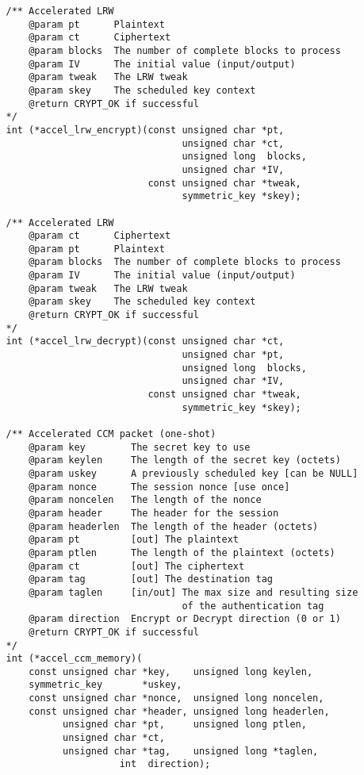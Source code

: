 \documentclass[synpaper]{book}
\begin{document}
\begin{small}
\begin{verbatim}
   /** Accelerated LRW
       @param pt      Plaintext
       @param ct      Ciphertext
       @param blocks  The number of complete blocks to process
       @param IV      The initial value (input/output)
       @param tweak   The LRW tweak
       @param skey    The scheduled key context
       @return CRYPT_OK if successful
   */
   int (*accel_lrw_encrypt)(const unsigned char *pt,
                                  unsigned char *ct,
                                  unsigned long  blocks,
                                  unsigned char *IV,
                            const unsigned char *tweak,
                                  symmetric_key *skey);

   /** Accelerated LRW
       @param ct      Ciphertext
       @param pt      Plaintext
       @param blocks  The number of complete blocks to process
       @param IV      The initial value (input/output)
       @param tweak   The LRW tweak
       @param skey    The scheduled key context
       @return CRYPT_OK if successful
   */
   int (*accel_lrw_decrypt)(const unsigned char *ct,
                                  unsigned char *pt,
                                  unsigned long  blocks,
                                  unsigned char *IV,
                            const unsigned char *tweak,
                                  symmetric_key *skey);

   /** Accelerated CCM packet (one-shot)
       @param key        The secret key to use
       @param keylen     The length of the secret key (octets)
       @param uskey      A previously scheduled key [can be NULL]
       @param nonce      The session nonce [use once]
       @param noncelen   The length of the nonce
       @param header     The header for the session
       @param headerlen  The length of the header (octets)
       @param pt         [out] The plaintext
       @param ptlen      The length of the plaintext (octets)
       @param ct         [out] The ciphertext
       @param tag        [out] The destination tag
       @param taglen     [in/out] The max size and resulting size
                                  of the authentication tag
       @param direction  Encrypt or Decrypt direction (0 or 1)
       @return CRYPT_OK if successful
   */
   int (*accel_ccm_memory)(
       const unsigned char *key,    unsigned long keylen,
       symmetric_key       *uskey,
       const unsigned char *nonce,  unsigned long noncelen,
       const unsigned char *header, unsigned long headerlen,
             unsigned char *pt,     unsigned long ptlen,
             unsigned char *ct,
             unsigned char *tag,    unsigned long *taglen,
                       int  direction);


\end{verbatim}
\end{small}
\end{document}

